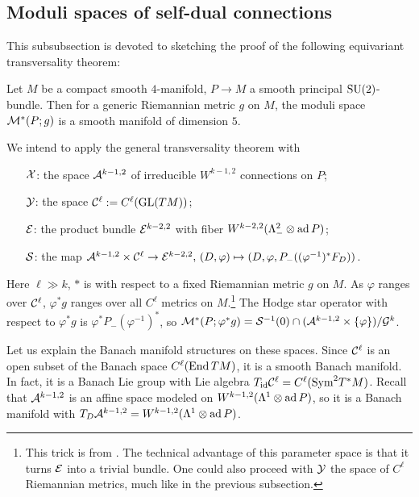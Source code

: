 \subsection{Moduli spaces of self-dual connections}
This subsubsection is devoted to sketching the proof of 
the following equivariant transversality theorem:

\begin{theorem}
	Let $M$ be a compact smooth $4$-manifold, 
	$P \to M$ a smooth principal ${\mathrm{SU}}(2)$-bundle. 
	Then for a generic Riemannian metric $g$ on $M$, 
	the moduli space ${\mathcal{M}}^*(P; g)$ is a smooth manifold of dimension $5$.
\end{theorem}

\noindent We intend to apply the general transversality theorem with
\begin{itemize}
	\item[${\mathcal{X}}$:] 
		the space ${\mathcal{A}}^{k - 1, 2}$ of irreducible 
		$W^{k - 1, 2}$ connections on $P$;
	\item[${\mathcal{Y}}$:] 
		the space ${\mathcal{C}}^\ell := C^\ell ({\mathrm{GL}}(TM))$;
	\item[${\mathcal{E}}$:] 
		the product bundle ${\mathcal{E}}^{k - 2, 2}$ with fiber 
		$W^{k - 2, 2} (\Lambda^2_- \otimes \operatorname{ad} P)$;
	\item[${\mathcal{S}}$:] 
		the map ${\mathcal{A}}^{k - 1, 2} \times {\mathcal{C}}^\ell \to {\mathcal{E}}^{k - 2, 2},\, 
		(D, \varphi) \mapsto (D, \varphi, P_- ((\varphi^{-1})^*F_D))$.
\end{itemize}
Here $\ell \gg k$, $*$ is with respect to 
a fixed Riemannian metric $g$ on $M$. 
As $\varphi$ ranges over ${\mathcal{C}}^\ell$, 
$\varphi^*g$ ranges over all $C^\ell$ metrics on $M$.\footnote{This 
trick is from \cite{FU}. The technical advantage of this parameter space 
is that it turns ${\mathcal{E}}$ into a trivial bundle. 
One could also proceed with ${\mathcal{Y}}$ the space of 
$C^\ell$ Riemannian metrics, much like in the previous subsection.} 
The Hodge star operator with respect to $\varphi^*g$ is 
$\varphi^* P_- (\varphi^{-1})^*$, so 
${\mathcal{M}}^*(P; \varphi^*g) = 
{\mathcal{S}}^{-1} (0) \cap ({\mathcal{A}}^{k - 1, 2} \times \{\varphi\}) / {\mathcal{G}}^k$.

Let us explain the Banach manifold structures on these spaces. 
Since ${\mathcal{C}}^\ell$ is an open subset of the Banach space $C^\ell(\operatorname{End} TM)$, 
it is a smooth Banach manifold. 
In fact, it is a Banach Lie group with 
Lie algebra $T_{{\mathrm{id}}} {\mathcal{C}}^\ell = C^\ell(\mathrm{Sym}^2 T^*M)$. 
Recall that ${\mathcal{A}}^{k - 1, 2}$ is an affine space modeled on 
$W^{k - 1, 2} (\Lambda^1 \otimes \operatorname{ad} P)$, so it is a Banach manifold 
with $T_D {\mathcal{A}}^{k - 1, 2} = W^{k - 1, 2} (\Lambda^1 \otimes \operatorname{ad} P)$.

